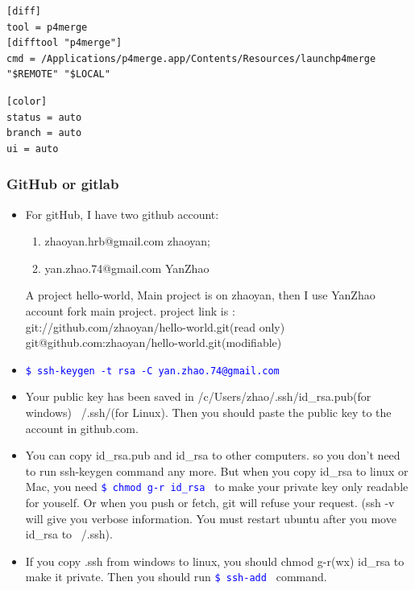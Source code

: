 \documentclass[a4paper,11pt,twoside]{book}
\newcommand{\linuxcommand}[1]{\texttt{\textcolor{blue}{\$ #1 \Pisymbol{psy}{191}}}}
\begin{document}
\begin{itemize}
\begin{lstlisting}
[diff]
tool = p4merge
[difftool "p4merge"]
cmd = /Applications/p4merge.app/Contents/Resources/launchp4merge "$REMOTE" "$LOCAL"
\end{lstlisting}
	
\begin{verbatim}
[color]
status = auto
branch = auto
ui = auto		
\end{verbatim}
	

	
\end{itemize}

\subsubsection{GitHub or gitlab}
\begin{itemize}
	\item For gitHub, I have two github account:
	\begin{enumerate}
		\item zhaoyan.hrb@gmail.com  zhaoyan;
		\item yan.zhao.74@gmail.com YanZhao
	\end{enumerate}
	A project hello-world, Main project is on zhaoyan, then I use YanZhao account fork main project. project link is : \\
	git://github.com/zhaoyan/hello-world.git(read only) \\
	git@github.com:zhaoyan/hello-world.git(modifiable)
	
	
	\item \linuxcommand{ssh-keygen -t rsa -C yan.zhao.74@gmail.com} 
	
	\item Your public key has been saved in /c/Users/zhao/.ssh/id\_rsa.pub(for windows) ~/.ssh/(for Linux). Then you should paste the public key to the account in github.com.  
	
	\item You can copy id\_rsa.pub and id\_rsa to other computers. so you don't need to run ssh-keygen command any more. But when you copy id\_rsa to linux or Mac, you need \linuxcommand{chmod g-r id\_rsa} to make your private key only readable for youself. Or when you push or fetch, git will refuse your request.  (ssh -v will give you verbose information. You must restart ubuntu after you move id\_rsa to ~/.ssh).
	
	
	\item If you copy .ssh from windows to linux, you should chmod g-r(wx) id\_rsa to make it private. Then you should run \linuxcommand{ssh-add} command. 
	

\end{itemize}
\end{document}
